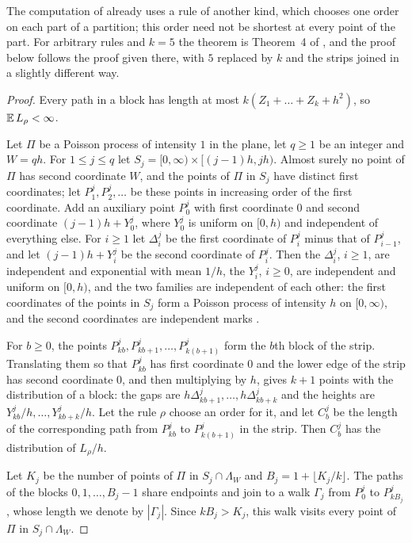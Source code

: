 The computation of \cite{YuCarlsson2023} already uses a rule of another kind, which chooses one order on each part of a partition; this order need not be shortest at every point of the part. For arbitrary rules and $k=5$ the theorem is Theorem~4 of \cite{DongCao2026}, and the proof below follows the proof given there, with $5$ replaced by $k$ and the strips joined in a slightly different way.

\begin{proof}
Every path in a block has length at most $k(Z_1+\dots+Z_k+h^2)$, so $\mathbb{E}\,L_\rho<\infty$.

Let $\Pi$ be a Poisson process of intensity $1$ in the plane, let $q\ge1$ be an integer and $W=qh$. For $1\le j\le q$ let $S_j=[0,\infty)\times[(j-1)h,jh)$. Almost surely no point of $\Pi$ has second coordinate $W$, and the points of $\Pi$ in $S_j$ have distinct first coordinates; let $P^j_1,P^j_2,\dots$ be these points in increasing order of the first coordinate. Add an auxiliary point $P^j_0$ with first coordinate $0$ and second coordinate $(j-1)h+Y^j_0$, where $Y^j_0$ is uniform on $[0,h)$ and independent of everything else. For $i\ge1$ let $\Delta^j_i$ be the first coordinate of $P^j_i$ minus that of $P^j_{i-1}$, and let $(j-1)h+Y^j_i$ be the second coordinate of $P^j_i$. Then the $\Delta^j_i$, $i\ge1$, are independent and exponential with mean $1/h$, the $Y^j_i$, $i\ge0$, are independent and uniform on $[0,h)$, and the two families are independent of each other: the first coordinates of the points in $S_j$ form a Poisson process of intensity $h$ on $[0,\infty)$, and the second coordinates are independent marks \cite{Kingman1993}.

For $b\ge0$, the points $P^j_{kb},P^j_{kb+1},\dots,P^j_{k(b+1)}$ form the $b$th block of the strip. Translating them so that $P^j_{kb}$ has first coordinate $0$ and the lower edge of the strip has second coordinate $0$, and then multiplying by $h$, gives $k+1$ points with the distribution of a block: the gaps are $h\Delta^j_{kb+1},\dots,h\Delta^j_{kb+k}$ and the heights are $Y^j_{kb}/h,\dots,Y^j_{kb+k}/h$. Let the rule $\rho$ choose an order for it, and let $C^j_b$ be the length of the corresponding path from $P^j_{kb}$ to $P^j_{k(b+1)}$ in the strip. Then $C^j_b$ has the distribution of $L_\rho/h$.

Let $K_j$ be the number of points of $\Pi$ in $S_j\cap \Lambda_W$ and $B_j=1+\lfloor K_j/k\rfloor$. The paths of the blocks $0,1,\dots,B_j-1$ share endpoints and join to a walk $\Gamma_j$ from $P^j_0$ to $P^j_{kB_j}$, whose length we denote by $|\Gamma_j|$. Since $kB_j>K_j$, this walk visits every point of $\Pi$ in $S_j\cap \Lambda_W$.


\end{proof}
